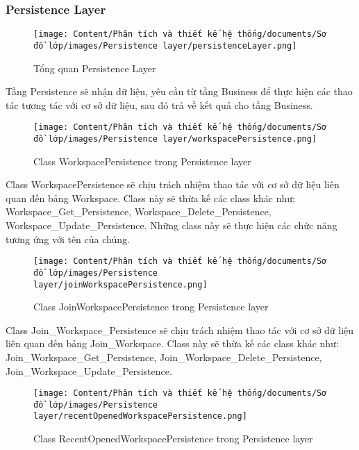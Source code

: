 \subsubsection{Persistence Layer}

\begin{figure}[H]
    \centering
    \texttt{[image: Content/Phân tích và thiết kế hệ thống/documents/Sơ đồ lớp/images/Persistence layer/persistenceLayer.png]}
    \vspace{0.5cm}
    \caption{Tổng quan Persistence Layer}
    \label{fig:Tổng quan Persistence Layer}
\end{figure}
Tầng Persistence sẽ nhận dữ liệu, yêu cầu từ tầng Business để thực hiện các thao tác tương tác với cơ sở dữ liệu, sau đó trả về kết quả cho tầng Business.

\begin{figure}[H]
    \centering
    \texttt{[image: Content/Phân tích và thiết kế hệ thống/documents/Sơ đồ lớp/images/Persistence layer/workspacePersistence.png]}
    \vspace{0.5cm}
    \caption{Class WorkspacePersistence trong Persistence layer}
    \label{fig:Class WorkspacePersistence trong Persistence layer}
\end{figure}
\par
Class WorkspacePersistence sẽ chịu trách nhiệm thao tác với cơ sở dữ liệu 
liên quan đến bảng Workspace. Class này sẽ thừa kế các class khác như:
Workspace\_Get\_Persistence, Workspace\_Delete\_Persistence, Workspace\_Update\_Persistence.
Những class này sẽ thực hiện các chức năng tương ứng với tên của chúng.
\begin{figure}[H]
    \centering
    \texttt{[image: Content/Phân tích và thiết kế hệ thống/documents/Sơ đồ lớp/images/Persistence layer/joinWorkspacePersistence.png]}
    \vspace{0.5cm}
    \caption{Class JoinWorkspacePersistence trong Persistence layer}
    \label{fig:Class JoinWorkspacePersistence trong Persistence layer}
\end{figure}
\par
Class Join\_Workspace\_Persistence sẽ chịu trách nhiệm thao tác với cơ sở dữ liệu
liên quan đến bảng Join\_Workspace. Class này sẽ thừa kế các class khác như:
Join\_Workspace\_Get\_Persistence, Join\_Workspace\_Delete\_Persistence, Join\_Workspace\_Update\_Persistence.
\begin{figure}[H]
    \centering
    \texttt{[image: Content/Phân tích và thiết kế hệ thống/documents/Sơ đồ lớp/images/Persistence layer/recentOpenedWorkspacePersistence.png]}
    \vspace{0.5cm}
    \caption{Class RecentOpenedWorkspacePersistence trong Persistence layer}
    \label{fig:Class RecentOpenedWorkspacePersistence trong Persistence layer}
\end{figure}
